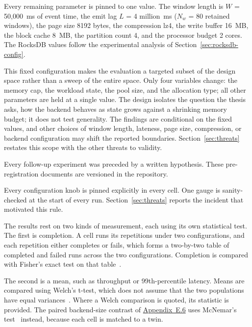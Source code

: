 Every remaining parameter is pinned to one value.
The window length is $W$ = 50{,}000\, ms of event time, the emit lag $L$ = 4 million\, ms ($N_w$ = 80 retained windows), the page size 8192 bytes, the compression lz4, the write buffer 16\, MB, the block cache 8\, MB, the partition count 4, and the processor budget 2 cores.
The RocksDB values follow the experimental analysis of Section~\ref{sec:rocksdb-config}.

This fixed configuration makes the evaluation a targeted subset of the design space rather than a sweep of the entire space.
Only four variables change: the memory cap, the workload state, the pool size, and the allocation type; all other parameters are held at a single value.
The design isolates the question the thesis asks, how the backend behaves as state grows against a shrinking memory budget; it does not test generality.
The findings are conditional on the fixed values, and other choices of window length, lateness, page size, compression, or backend configuration may shift the reported boundaries.
Section~\ref{sec:threats} restates this scope with the other threats to validity.

Every follow-up experiment was preceded by a written hypothesis.
These pre-registration documents are versioned in the repository.

Every configuration knob is pinned explicitly in every cell.
One gauge is sanity-checked at the start of every run.
Section~\ref{sec:threats} reports the incident that motivated this rule.

The results rest on two kinds of measurement, each using its own statistical test.
The first is completion.
A cell runs its repetitions under two configurations, and each repetition either completes or fails, which forms a two-by-two table of completed and failed runs across the two configurations.
Completion is compared with Fisher's exact test on that table~\cite{fisher1935}.

The second is a mean, such as throughput or 99th-percentile latency.
Means are compared using Welch's t-test, which does not assume that the two populations have equal variances~\cite {welch1947}.
Where a Welch comparison is quoted, its statistic is provided.
The paired backend-size contrast of \hyperref[app:rb32]{Appendix~E.6} uses McNemar's test~\cite{mcnemar1947} instead, because each cell is matched to a twin.

